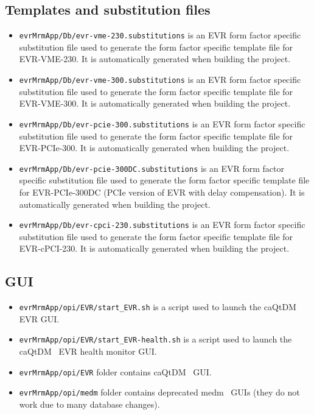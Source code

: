 \documentclass[12pt,a4paper]{article}
\begin{document}
\subsection{Templates and substitution files}\label{sec:mrfioc2 organization:substitution}
\begin{itemize}
\item 
	\texttt{evrMrmApp/Db/evr-vme-230.substitutions} is an EVR form factor specific substitution file used to generate the form factor specific template file for EVR-VME-230. It is automatically generated when building the project.
\item 
	\texttt{evrMrmApp/Db/evr-vme-300.substitutions} is an EVR form factor specific substitution file used to generate the form factor specific template file for EVR-VME-300. It is automatically generated when building the project.
\item 
	\texttt{evrMrmApp/Db/evr-pcie-300.substitutions} is an EVR form factor specific substitution file used to generate the form factor specific template file for EVR-PCIe-300. It is automatically generated when building the project.
\item 
	\texttt{evrMrmApp/Db/evr-pcie-300DC.substitutions} is an EVR form factor specific substitution file used to generate the form factor specific template file for EVR-PCIe-300DC (PCIe version of EVR with delay compensation). It is automatically generated when building the project.
\item 
	\texttt{evrMrmApp/Db/evr-cpci-230.substitutions} is an EVR form factor specific substitution file used to generate the form factor specific template file for EVR-cPCI-230. It is automatically generated when building the project.
\end{itemize}

\subsection{GUI}\label{sec:mrfioc2 organization:gui}
\begin{itemize}
\item 
	\texttt{evrMrmApp/opi/EVR/start\_EVR.sh} is a script used to launch the caQtDM~\cite{caqtdm} EVR GUI.
\item 
	\texttt{evrMrmApp/opi/EVR/start\_EVR-health.sh} is a script used to launch the caQtDM~\cite{caqtdm} EVR health monitor GUI.
\item 
	\texttt{evrMrmApp/opi/EVR} folder contains caQtDM~\cite{caqtdm} GUI.
\item 
	\texttt{evrMrmApp/opi/medm} folder contains deprecated medm~\cite{medm} GUIs (they do not work due to many database changes).
\end{itemize}
\end{document}
